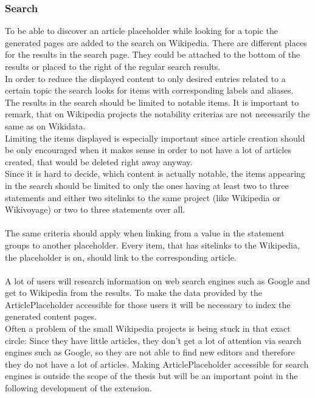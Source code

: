 \subsubsection{Search}
To be able to discover an article placeholder while looking for a topic the generated pages are added to the search on Wikipedia. There are different places for the results in the search page. They could be attached to the bottom of the results or placed to the right of the regular search results. \\
In order to reduce the displayed content to only desired entries related to a certain topic the search looks for items with corresponding labels and aliases.  \\
The results in the search should be limited to notable items. It is important to remark, that on Wikipedia projects the notability criterias  are not necessarily the same as on Wikidata. \\
 Limiting the items displayed is especially important since article creation should be only encouraged when it makes sense in order to not have a lot of articles created, that would be deleted right away anyway.\\
Since it is hard to decide, which content is actually notable, the items appearing in the search should be limited to only the ones having at least two to three statements and either two sitelinks to the same project (like Wikipedia or Wikivoyage) or two to three statements over all. \\
\\
The same criteria should apply when linking from a value in the statement groups to another placeholder. Every item, that has sitelinks to the Wikipedia, the placeholder is on, should link to the corresponding article.  \\
\\
A lot of users will research information on web search engines such as Google and get to Wikipedia from the results. To make the data provided by the ArticlePlaceholder accessible for those users it will be necessary to index the generated content pages.  \\
Often a problem of the small Wikipedia projects is being stuck in that exact circle: Since they have little articles, they don't get a lot of attention via search engines such as Google, so they are not able to find new editors and therefore they do not have a lot of articles. 
Making ArticlePlaceholder accessible for search engines is outside the scope of the thesis but will be an important point in the following development of the extension. 
